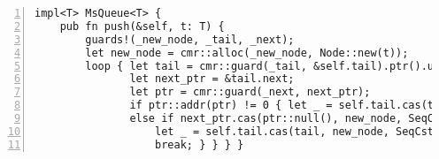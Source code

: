 \begin{lstlisting}[label=lst:msqueue,
                   caption=The \code{push} operation on a Michael-Scott Queue.,
                   numbers=left, numberstyle=\color{gray}\ttfamily{}MS,
                   ]
impl<T> MsQueue<T> {
    pub fn push(&self, t: T) {
        guards!(_new_node, _tail, _next);
        let new_node = cmr::alloc(_new_node, Node::new(t));
        loop { let tail = cmr::guard(_tail, &self.tail).ptr().unwrap();
               let next_ptr = &tail.next;
               let ptr = cmr::guard(_next, next_ptr);
               if ptr::addr(ptr) != 0 { let _ = self.tail.cas(tail, ptr, SeqCst); }
               else if next_ptr.cas(ptr::null(), new_node, SeqCst).is_ok() {
                   let _ = self.tail.cas(tail, new_node, SeqCst);
                   break; } } } }
\end{lstlisting}
